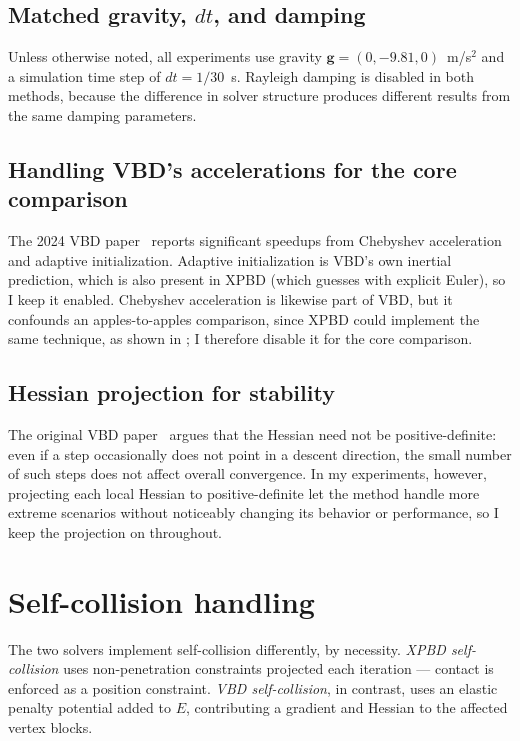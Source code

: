 \subsection{Matched gravity, $dt$, and damping}
\label{ssec:MatchedDtGravity}
Unless otherwise noted, all experiments use gravity
$\mathbf{g} = (0, -9.81, 0)$~m/s$^{2}$ and a simulation time step of
$dt = 1/30$~s. Rayleigh damping is disabled in both methods, because the
difference in solver structure produces different results from the same damping
parameters.

\subsection{Handling VBD's accelerations for the core comparison}
\label{ssec:DisableChebyshev}
The 2024 VBD paper~\cite{Chen2024} reports significant speedups from Chebyshev
acceleration and adaptive initialization. Adaptive initialization is VBD's own
inertial prediction, which is also present in XPBD (which guesses with explicit
Euler), so I keep it enabled. Chebyshev acceleration is likewise part of VBD, but
it confounds an apples-to-apples comparison, since XPBD could implement the same
technique, as shown in \cite{10.1145/2816795.2818063}; I therefore disable it for
the core comparison.

\subsection{Hessian projection for stability}
\label{ssec:HessianProjection}
The original VBD paper~\cite{Chen2024} argues that the Hessian need not be positive-definite: even
if a step occasionally does not point in a descent direction, the small number of
such steps does not affect overall convergence. In my experiments, however,
projecting each local Hessian to positive-definite let the method handle more
extreme scenarios without noticeably changing its behavior or performance, so I
keep the projection on throughout.

\section{Self-collision handling}
\label{sec:SelfCollision}
The two solvers implement self-collision differently, by necessity.
\emph{XPBD self-collision} uses non-penetration constraints projected each
iteration --- contact is enforced as a position constraint. \emph{VBD
self-collision}, in contrast, uses an elastic penalty potential added to $E$,
contributing a gradient and Hessian to the affected vertex blocks.

